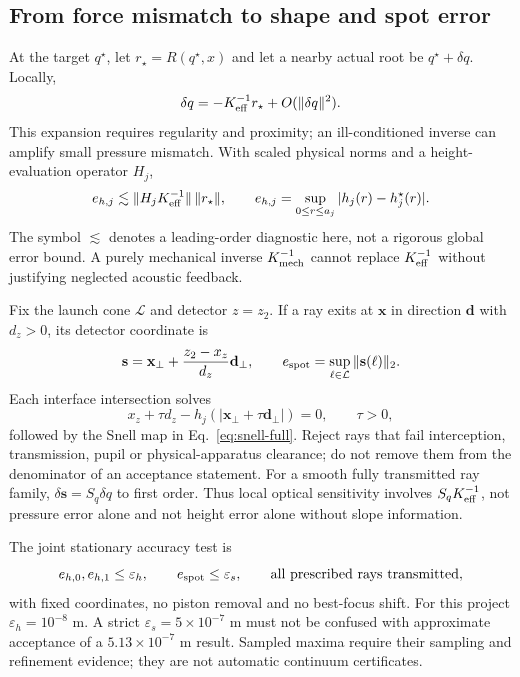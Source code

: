 \subsection{From force mismatch to shape and spot error}
At the target $q^\star$, let $r_\star=R(q^\star,x)$ and let a nearby actual
root be $q^\star+\delta q$. Locally,
\begin{equation}\label{eq:residual-error}
 \delta q=-K_{\rm eff}^{-1}r_\star+O(\|\delta q\|^2).
\end{equation}
This expansion requires regularity and proximity; an ill-conditioned inverse
can amplify small pressure mismatch. With scaled physical norms and a
height-evaluation operator $H_j$,
\begin{equation}\label{eq:height-bound}
 e_{h,j}\lesssim\|H_jK_{\rm eff}^{-1}\|\,\|r_\star\|,
 \qquad e_{h,j}=\sup_{0\le r\le a_j}|h_j(r)-h_j^\star(r)|.
\end{equation}
The symbol $\lesssim$ denotes a leading-order diagnostic here, not a rigorous
global error bound. A purely mechanical inverse $K_{\rm mech}^{-1}$ cannot
replace $K_{\rm eff}^{-1}$ without justifying neglected acoustic feedback.

Fix the launch cone $\mathcal L$ and detector $z=z_2$. If a ray exits at
$\mathbf x$ in direction $\mathbf d$ with $d_z>0$, its detector coordinate is
\begin{equation}\label{eq:detector}
 \mathbf s=\mathbf x_\perp+\frac{z_2-x_z}{d_z}\mathbf d_\perp,
 \qquad e_{\rm spot}=\sup_{\ell\in\mathcal L}\|\mathbf s(\ell)\|_2.
\end{equation}
Each interface intersection solves
\begin{equation}
 x_z+\tau d_z-h_j(|\mathbf x_\perp+\tau\mathbf d_\perp|)=0,
 \qquad \tau>0,
\end{equation}
followed by the Snell map in Eq.~\eqref{eq:snell-full}. Reject rays that fail
interception, transmission, pupil or physical-apparatus clearance; do not
remove them from the denominator of an acceptance statement. For a smooth
fully transmitted ray family, $\delta\mathbf s=S_q\delta q$ to first order.
Thus local optical sensitivity involves $S_qK_{\rm eff}^{-1}$, not pressure
error alone and not height error alone without slope information.

The joint stationary accuracy test is
\begin{equation}\label{eq:acceptance}
 e_{h,0},e_{h,1}\le\varepsilon_h,\qquad
 e_{\rm spot}\le\varepsilon_s,\qquad
 \text{all prescribed rays transmitted},
\end{equation}
with fixed coordinates, no piston removal and no best-focus shift.
For this project $\varepsilon_h=10^{-8}$ m. A strict
$\varepsilon_s=5\times10^{-7}$ m must not be confused with approximate
acceptance of a $5.13\times10^{-7}$ m result. Sampled maxima require their
sampling and refinement evidence; they are not automatic continuum certificates.

